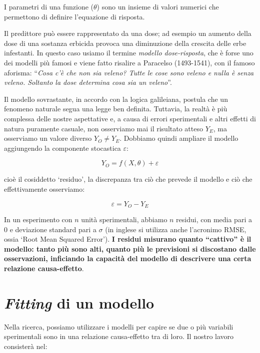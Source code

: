 \documentclass[
  12pt,
]{book}
\begin{document}
I parametri di una funzione (\(\theta\)) sono un insieme di valori numerici che permettono di definire l'equazione di risposta.

Il predittore può essere rappresentato da una dose; ad esempio un aumento della dose di una sostanza erbicida provoca una diminuzione della crescita delle erbe infestanti. In questo caso usiamo il termine \emph{modello dose-risposta}, che è forse uno dei modelli più famosi e viene fatto risalire a Paracelso (1493-1541), con il famoso aforisma: ``\emph{Cosa c'è che non sia veleno? Tutte le cose sono veleno e nulla è senza veleno. Soltanto la dose determina cosa sia un veleno}''.

Il modello sovrastante, in accordo con la logica galileiana, postula che un fenomeno naturale segua una legge ben definita. Tuttavia, la realtà è più complessa delle nostre aspettative e, a causa di errori sperimentali e altri effetti di natura puramente casuale, non osserviamo mai il risultato atteso \(Y_E\), ma osserviamo un valore diverso \(Y_O \neq Y_E\). Dobbiamo quindi ampliare il modello aggiungendo la componente stocastica \(\varepsilon\):

\[ Y_O = f(X, \theta) + \varepsilon\]

cioè il cosiddetto `residuo', la discrepanza tra ciò che prevede il modello e ciò che effettivamente osserviamo:

\[\varepsilon = Y_O - Y_E \]

In un esperimento con \(n\) unità sperimentali, abbiamo \(n\) residui, con media pari a 0 e deviazione standard pari a \(\sigma\) (in inglese si utilizza anche l'acronimo RMSE, ossia `Root Mean Squared Error'). \textbf{I residui misurano quanto ``cattivo'' è il modello: tanto più sono alti, quanto più le previsioni si discostano dalle osservazioni, inficiando la capacità del modello di descrivere una certa relazione causa-effetto}.

\hypertarget{fitting-di-un-modello}{%
\section{\texorpdfstring{\emph{Fitting} di un modello}{Fitting di un modello}}\label{fitting-di-un-modello}}

Nella ricerca, possiamo utilizzare i modelli per capire se due o più variabili sperimentali sono in una relazione causa-effetto tra di loro. Il nostro lavoro consisterà nel:
\end{document}
